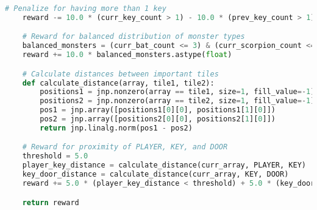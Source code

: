 \begin{tcolorbox}[colback=white, colframe=gray, title=Generated Reward Function Example, breakable]
\begin{lstlisting}[language=Python]
    # Penalize for having more than 1 key
    reward -= 10.0 * (curr_key_count > 1) - 10.0 * (prev_key_count > 1)

    # Reward for balanced distribution of monster types
    balanced_monsters = (curr_bat_count <= 3) & (curr_scorpion_count <= 3) & (curr_spider_count <= 3)
    reward += 10.0 * balanced_monsters.astype(float)

    # Calculate distances between important tiles
    def calculate_distance(array, tile1, tile2):
        positions1 = jnp.nonzero(array == tile1, size=1, fill_value=-1)
        positions2 = jnp.nonzero(array == tile2, size=1, fill_value=-1)
        pos1 = jnp.array([positions1[0][0], positions1[1][0]])
        pos2 = jnp.array([positions2[0][0], positions2[1][0]])
        return jnp.linalg.norm(pos1 - pos2)

    # Reward for proximity of PLAYER, KEY, and DOOR
    threshold = 5.0
    player_key_distance = calculate_distance(curr_array, PLAYER, KEY)
    key_door_distance = calculate_distance(curr_array, KEY, DOOR)
    reward += 5.0 * (player_key_distance < threshold) + 5.0 * (key_door_distance < threshold)

    return reward

\end{lstlisting}
\end{tcolorbox}

